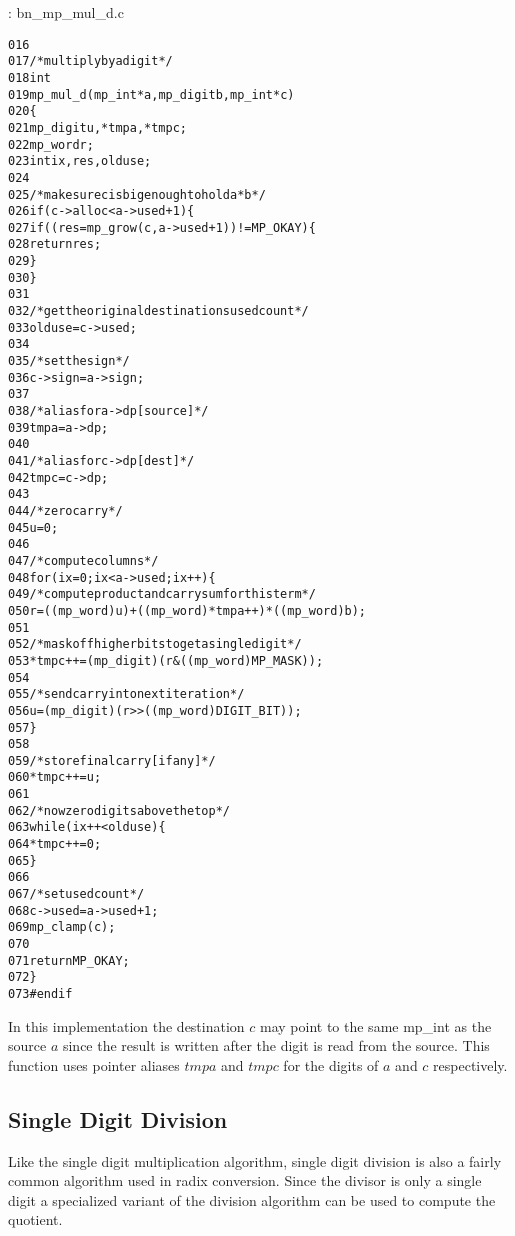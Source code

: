 \documentclass[b5paper]{book}
\begin{document}
\vspace{+3mm}\begin{small}
\hspace{-5.1mm}{\bf File}: bn\_mp\_mul\_d.c
\vspace{-3mm}
\begin{alltt}
016   
017   /* multiply by a digit */
018   int
019   mp_mul_d (mp_int * a, mp_digit b, mp_int * c)
020   \{
021     mp_digit u, *tmpa, *tmpc;
022     mp_word  r;
023     int      ix, res, olduse;
024   
025     /* make sure c is big enough to hold a*b */
026     if (c->alloc < a->used + 1) \{
027       if ((res = mp_grow (c, a->used + 1)) != MP_OKAY) \{
028         return res;
029       \}
030     \}
031   
032     /* get the original destinations used count */
033     olduse = c->used;
034   
035     /* set the sign */
036     c->sign = a->sign;
037   
038     /* alias for a->dp [source] */
039     tmpa = a->dp;
040   
041     /* alias for c->dp [dest] */
042     tmpc = c->dp;
043   
044     /* zero carry */
045     u = 0;
046   
047     /* compute columns */
048     for (ix = 0; ix < a->used; ix++) \{
049       /* compute product and carry sum for this term */
050       r       = ((mp_word) u) + ((mp_word)*tmpa++) * ((mp_word)b);
051   
052       /* mask off higher bits to get a single digit */
053       *tmpc++ = (mp_digit) (r & ((mp_word) MP_MASK));
054   
055       /* send carry into next iteration */
056       u       = (mp_digit) (r >> ((mp_word) DIGIT_BIT));
057     \}
058   
059     /* store final carry [if any] */
060     *tmpc++ = u;
061   
062     /* now zero digits above the top */
063     while (ix++ < olduse) \{
064        *tmpc++ = 0;
065     \}
066   
067     /* set used count */
068     c->used = a->used + 1;
069     mp_clamp(c);
070   
071     return MP_OKAY;
072   \}
073   #endif
\end{alltt}
\end{small}

In this implementation the destination $c$ may point to the same mp\_int as the source $a$ since the result is written after the digit is 
read from the source.  This function uses pointer aliases $tmpa$ and $tmpc$ for the digits of $a$ and $c$ respectively.  

\subsection{Single Digit Division}
Like the single digit multiplication algorithm, single digit division is also a fairly common algorithm used in radix conversion.  Since the
divisor is only a single digit a specialized variant of the division algorithm can be used to compute the quotient.  
\end{document}
